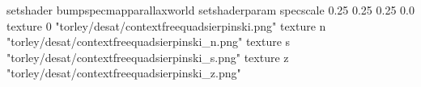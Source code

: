 setshader bumpspecmapparallaxworld
setshaderparam specscale 0.25 0.25 0.25 0.0
texture 0 "torley/desat/contextfreequadsierpinski.png"
texture n "torley/desat/contextfreequadsierpinski_n.png"
texture s "torley/desat/contextfreequadsierpinski_s.png"
texture z "torley/desat/contextfreequadsierpinski_z.png"

